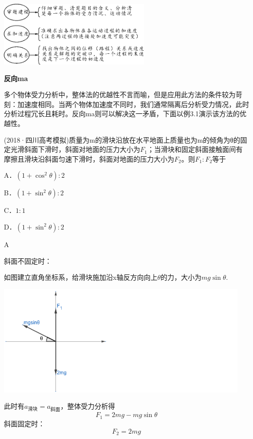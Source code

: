 \begin{center}\includegraphics[width=3in,height=1.29167in]{media/image133.png}\end{center}
\newpage
\begin{problemset}
	\item \textbf{反向ma}
	
	\qquad 多个物体受力分析中，整体法的优越性不言而喻，但是应用此方法的条件较为苛刻：加速度相同。当两个物体加速度不同时，我们通常隔离后分析受力情况，此时分析过程冗长且耗时。反向ma则可以解决这一矛盾，下面以例3.1演示该方法的优越性。
	\begin{example}
		(2018·四川高考模拟)质量为m的滑块沿放在水平地面上质量也为m的倾角为θ的固定光滑斜面下滑时，斜面对地面的压力大小为$F_1$；当滑块和固定斜面接触面间有摩擦且滑块沿斜面匀速下滑时，斜面对地面的压力大小为$F_2$。则$F_1:F_2$等于
		
		    A．$(1+\cos^2\theta):2$
    		
    		B．$(1+\sin^2\theta):2$  
    
    		C．$1:1    $     
    
    		D．$(1+\sin^2\theta):2$ 
    		\begin{solution}A
    		
    		斜面不固定时：
    		
			如图建立直角坐标系，给滑块施加沿x轴反方向向上$\theta$的力，大小为$mg\sin\theta$.
\begin{center}
	\includegraphics[width=5in]{media/31.png}
\end{center}

				此时有$a_{\text{滑块}}=a_{\text{斜面}}$，整体受力分析得
			\begin{equation}
				F_1=2mg-mg\sin\theta
			\end{equation}
			斜面固定时：
			\begin{equation}
				F_2=2mg
			\end{equation}
			

\end{solution}
\end{example}
\end{problemset}
